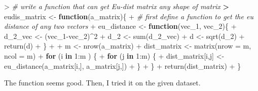 \documentclass[
]{article}
\newenvironment{Shaded}{\begin{snugshade}}{\end{snugshade}}
\newcommand{\AttributeTok}[1]{\textcolor[rgb]{0.77,0.63,0.00}{#1}}
\newcommand{\CommentTok}[1]{\textcolor[rgb]{0.56,0.35,0.01}{\textit{#1}}}
\newcommand{\ControlFlowTok}[1]{\textcolor[rgb]{0.13,0.29,0.53}{\textbf{#1}}}
\newcommand{\DecValTok}[1]{\textcolor[rgb]{0.00,0.00,0.81}{#1}}
\newcommand{\ErrorTok}[1]{\textcolor[rgb]{0.64,0.00,0.00}{\textbf{#1}}}
\newcommand{\FunctionTok}[1]{\textcolor[rgb]{0.00,0.00,0.00}{#1}}
\newcommand{\NormalTok}[1]{#1}
\newcommand{\OtherTok}[1]{\textcolor[rgb]{0.56,0.35,0.01}{#1}}
\newcommand{\SpecialCharTok}[1]{\textcolor[rgb]{0.00,0.00,0.00}{#1}}
\begin{document}
\begin{Shaded}
\begin{Highlighting}[]
\SpecialCharTok{\textgreater{}} \CommentTok{\# write a function that can get Eu{-}dist matrix any shape of matrix}
\ErrorTok{\textgreater{}}\NormalTok{ eudis\_matrix }\OtherTok{\textless{}{-}} \ControlFlowTok{function}\NormalTok{(a\_matrix)\{}
\SpecialCharTok{+}   \CommentTok{\# first define a function to get the eu distance of any two vectors}
\SpecialCharTok{+}\NormalTok{   eu\_distance }\OtherTok{\textless{}{-}} \ControlFlowTok{function}\NormalTok{(vec\_1, vec\_2)\{}
\SpecialCharTok{+}\NormalTok{     d\_2\_vec }\OtherTok{\textless{}{-}}\NormalTok{ (vec\_1}\SpecialCharTok{{-}}\NormalTok{vec\_2)}\SpecialCharTok{\^{}}\DecValTok{2}
\SpecialCharTok{+}\NormalTok{     d\_2 }\OtherTok{\textless{}{-}} \FunctionTok{sum}\NormalTok{(d\_2\_vec)}
\SpecialCharTok{+}\NormalTok{     d }\OtherTok{\textless{}{-}} \FunctionTok{sqrt}\NormalTok{(d\_2)}
\SpecialCharTok{+}     \FunctionTok{return}\NormalTok{(d)}
\SpecialCharTok{+}\NormalTok{     \}}
\SpecialCharTok{+}   
\SpecialCharTok{+}\NormalTok{   m }\OtherTok{\textless{}{-}} \FunctionTok{nrow}\NormalTok{(a\_matrix)}
\SpecialCharTok{+}\NormalTok{   dist\_matrix }\OtherTok{\textless{}{-}} \FunctionTok{matrix}\NormalTok{(}\AttributeTok{nrow =}\NormalTok{ m, }\AttributeTok{ncol =}\NormalTok{ m)}
\SpecialCharTok{+}   \ControlFlowTok{for}\NormalTok{ (i }\ControlFlowTok{in} \DecValTok{1}\SpecialCharTok{:}\NormalTok{m ) \{}
\SpecialCharTok{+}     \ControlFlowTok{for}\NormalTok{ (j }\ControlFlowTok{in} \DecValTok{1}\SpecialCharTok{:}\NormalTok{m) \{}
\SpecialCharTok{+}\NormalTok{       dist\_matrix[i,j] }\OtherTok{\textless{}{-}} \FunctionTok{eu\_distance}\NormalTok{(a\_matrix[i,], a\_matrix[j,])}
\SpecialCharTok{+}\NormalTok{     \}}
\SpecialCharTok{+}\NormalTok{   \}}
\SpecialCharTok{+}   \FunctionTok{return}\NormalTok{(dist\_matrix)}
\SpecialCharTok{+}\NormalTok{ \}}
\end{Highlighting}
\end{Shaded}

The function seems good. Then, I tried it on the given dataset.
\end{document}
